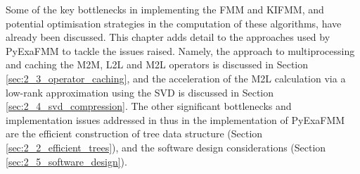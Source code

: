 Some of the key bottlenecks in implementing the \gls{FMM} and \gls{KIFMM}, and potential
optimisation strategies in the computation of these algorithms, have already been
discussed. This chapter adds detail to the approaches used by \gls{PyExaFMM} to tackle
the issues raised. Namely, the approach to multiprocessing and caching the \gls{M2M},
\gls{L2L} and \gls{M2L} operators is discussed in Section \ref{sec:2_3_operator_caching}, and
the acceleration of the \gls{M2L} calculation via a low-rank approximation using the \gls{SVD}
is discussed in Section \ref{sec:2_4_svd_compression}. The other significant bottlenecks
and implementation issues addressed in thus in the implementation of \gls{PyExaFMM} are the
efficient construction of tree data structure (Section \ref{sec:2_2_efficient_trees}),
and the software design considerations (Section \ref{sec:2_5_software_design}).

